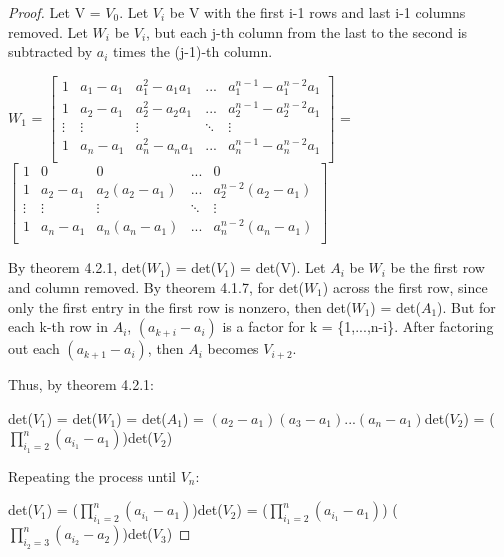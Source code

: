     \begin{proof}
        Let V = $V_0$. Let $V_i$ be V with the first i-1 rows and last i-1 columns
        removed. Let $W_i$ be $V_i$, but each j-th column from the last
        to the second is subtracted by $a_i$ times the (j-1)-th column.

        \hspace{0.5cm}
        \scriptsize
        $W_1$ =
        $\begin{bmatrix}
            1 & a_1-a_1 & a_1^2-a_1a_1 & ... & a_1^{n-1}-a_1^{n-2}a_1 \\
            1 & a_2-a_1 & a_2^2-a_2a_1 & ... & a_2^{n-1}-a_2^{n-2}a_1 \\
            \vdots & \vdots & \vdots & \ddots & \vdots \\
            1 & a_n-a_1 & a_n^2-a_na_1 & ... & a_n^{n-1}-a_n^{n-2}a_1 \\
        \end{bmatrix}$ =
        $\begin{bmatrix}
            1 & 0 & 0 & ... & 0 \\
            1 & a_2-a_1 & a_2(a_2-a_1) & ... & a_2^{n-2}(a_2-a_1) \\
            \vdots & \vdots & \vdots & \ddots & \vdots \\
            1 & a_n-a_1 & a_n(a_n-a_1) & ... & a_n^{n-2}(a_n-a_1) \\
        \end{bmatrix}$
        \normalsize

        By {\color{red} theorem 4.2.1}, det($W_1$) = det($V_1$) = det(V).
        Let $A_i$ be $W_i$ be the first row and column removed.
        By {\color{red} theorem 4.1.7}, for det($W_1$) across the first row,
        since only the first entry in the first row is nonzero, then
        det($W_1$) = det($A_1$).
        But for each k-th row in $A_i$, $(a_{k+i}-a_i)$ is a factor for
        k = \{1,...,n-i\}.
        After factoring out each $(a_{k+1}-a_i)$, then $A_i$ becomes $V_{i+2}$.
        
        Thus, by {\color{red} theorem 4.2.1}:

        \hspace{0.4cm}
        det($V_1$)
        = det($W_1$)
        = det($A_1$)
        = $(a_2-a_1)(a_3-a_1)...(a_n-a_1)$det($V_2$)
        = ($\prod_{i_1=2}^n (a_{i_1} - a_1)$)det($V_2$)

        Repeating the process until $V_n$:

        \hspace{0.5cm}
        det($V_1$)
        = ($\prod_{i_1=2}^n (a_{i_1} - a_1)$)det($V_2$)
        = ($\prod_{i_1=2}^n (a_{i_1} - a_1)$)
            ($\prod_{i_2=3}^n (a_{i_2} - a_2)$)det($V_3$)


\end{proof}
